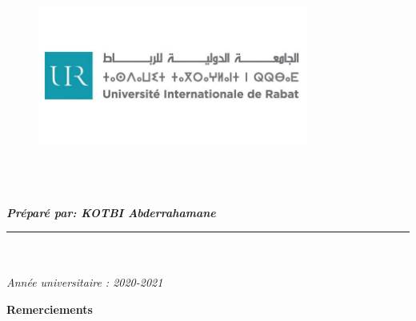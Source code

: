 \documentclass[a4paper]{report}
\begin{document}
\begin{titlepage}
\begin{center}
        \vspace*{0.5cm} \noindent \hspace{ -0.5 cm} \large
        \begin{figure}[H]
            \begin{center}
                \includegraphics[width=3.5in,height=3in]{images/logo-uir2.jpg}
            \end{center}
        \end{figure}
        \raggedright
        {\textbf{\emph{Préparé par: KOTBI Abderrahamane}}}
        \raggedleft\rule{0.7\linewidth}{2pt}\\
        \\
        \Large\emph{Année universitaire : 2020-2021}

    \end{center}
\end{titlepage}
 \setcounter{page}{1}
\begin{doublespace}
    \begin{center}
        \vspace*{1cm}

        \textbf{\huge{Remerciements}}

    \end{center}
\end{doublespace}
\end{document}
